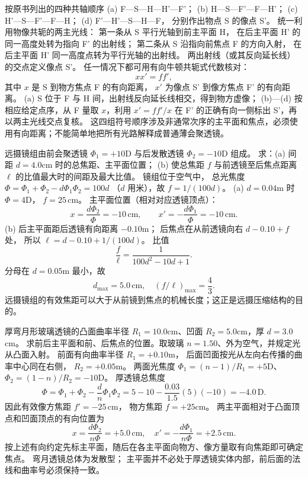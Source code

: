按原书列出的四种共轴顺序
(a) F—S—H—H'—F'；
(b) H—S—F'—F—H'；
(c) H'—S—F'—F—H；
(d) F'—H'—S—H—F，
分别作出物点 S 的像点 S'。
\exsolution
统一利用物像共轭的两主光线：
第一条从 S 平行光轴到前主平面 H，
在后主平面 H' 的同一高度处转为指向 F' 的出射线；
第二条从 S 沿指向前焦点 F 的方向入射，
在后主平面 H' 同一高度点转为平行光轴的出射线。
两出射线（或其反向延长线）的交点定义像点 S'。
任一情况下都可用有向牛顿共轭式代数核对：
\[
\boxed{xx'=ff'},
\]
其中 $x$ 是 S 到物方焦点 F 的有向距离，
$x'$ 为像点 S' 到像方焦点 F' 的有向距离。
(a) S 位于 F 与 H 间，出射线反向延长线相交，得到物方虚像；
(b)—(d) 按相应给定点序，从 F 量取 $x$，利用 $x'=ff'/x$ 在 F' 的正确有向一侧标出 S'，再以两主光线交点复核。
\excheck 这四组符号顺序涉及非通常次序的主平面和焦点，必须使用有向距离；不能简单地把所有光路解释成普通薄会聚透镜。

远摄镜组由前会聚透镜
$\Phi_1=+10$D 与后发散透镜
$\Phi_2=-10$D 组成。
求：(a) 间距 $d=4.0$cm 时的总焦距、主平面位置；
(b) 使总焦距 $f$ 与前透镜至后焦点距离
$\ell$ 的比值最大时的间距及最大比值。
\exsolution
镜组位于空气中，
总光焦度
$\Phi=\Phi_1+\Phi_2-d\Phi_1\Phi_2=100d$
（$d$ 用米），故
$\boxed{f=1/(100d)}$。
(a) $d=0.04$m 时
$\Phi=4$D，
$\boxed{f=25\,\mathrm{cm}}$。
主平面位置（相对对应透镜顶点）：
\[
\boxed{x=\frac{d\Phi_2}\Phi=-10\,\mathrm{cm}},
\qquad
\boxed{x'=-\frac{d\Phi_1}\Phi=-10\,\mathrm{cm}}.
\]
(b) 后主平面距后透镜有向距离 $-0.10$m；
后焦点在从前透镜向右 $d-0.10+f$ 处，
所以
$\ell=d-0.10+1/(100d)$。
比值
\[
\frac f\ell=\frac1{100d^2-10d+1}.
\]
分母在 $d=0.05$m 最小，故
\[
\boxed{d_{\max}=5.0\,\mathrm{cm}},
\quad
\boxed{(f/\ell)_{\max}=\frac43}.
\]
\excheck 远摄镜组的有效焦距可以大于从前镜到焦点的机械长度；这正是远摄压缩结构的目的。

厚弯月形玻璃透镜的凸面曲率半径
$R_1=10.0$cm、凹面
$R_2=5.0$cm，厚
$d=3.0$cm。
求前后主平面和前、后焦点的位置。取玻璃 $n=1.50$、外为空气，并规定光从凸面入射。
\exsolution
前面有向曲率半径 $R_1=+0.10$m，
后面凹面按光从左向右传播的曲率中心同在右侧，
$R_2=+0.05$m。
两面光焦度
$\Phi_1=(n-1)/R_1=+5$D、
$\Phi_2=(1-n)/R_2=-10$D。
厚透镜总焦度
\[
\Phi=\Phi_1+\Phi_2-\frac d n\Phi_1\Phi_2
=5-10-\frac{0.03}{1.5}(5)(-10)
=\boxed{-4.0\,\mathrm D}.
\]
因此有效像方焦距
$\boxed{f'=-25\,\mathrm{cm}}$，
物方焦距 $f=+25$cm。
两主平面相对于凸面顶点和凹面顶点的有向位置为
\[
\boxed{x=\frac{d\Phi_2}{n\Phi}=+5.0\,\mathrm{cm}},
\quad
\boxed{x'=-\frac{d\Phi_1}{n\Phi}=+2.5\,\mathrm{cm}}.
\]
按上述有向约定先标主平面，随后在各主平面向物方、像方量取有向焦距即可确定焦点。
\excheck 弯月透镜总体为发散型；
主平面并不必处于厚透镜实体内部，前后面的法线和曲率号必须保持一致。

